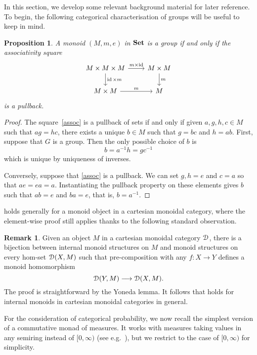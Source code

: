 \documentclass[a4paper,UKenglish,numberwithinsect,cleveref, autoref, thm-restate]{lipics-v2021}
\theoremstyle{plain} %
\newtheorem{myproposition}[mytheorem]{Proposition}
\theoremstyle{definition} %
\newtheorem{myremark}[mytheorem]{Remark}
\begin{document}
In this section, we develop some relevant background material for later reference.
To begin, the following categorical characterisation of groups will be useful to keep in mind.
\begin{myproposition}\label{assoc_group}
 A monoid $(M,m,e)$ in $\mathbf{Set}$ is a group if and only if the associativity square
 \begin{equation}\label{assoc}
  \begin{tikzcd}
   M \times M \times M \ar{d}{\id\times m} \ar{r}{m\times\id} & M\times M \ar{d}{m} \\
   M\times M \ar{r}{m} & M
  \end{tikzcd}
 \end{equation}
 is a pullback.
\end{myproposition}
\begin{proof}
 The square~\eqref{assoc} is a pullback of sets if and only if given $a,g,h,c\in M$ such that $ag=hc$, there exists a unique $b\in M$ such that $g=bc$ and $h=ab$.
 First, suppose that $G$ is a group. Then the only possible choice of $b$ is 
 \[
  b = a^{-1}h = gc^{-1}
 \]
 which is unique by uniqueness of inverses. 
 
 Conversely, suppose that \eqref{assoc} is a pullback. We can set $g,h=e$ and $c=a$ so that $ae=ea=a$. 
 Instantiating the pullback property on these elements gives $b$ such that $ab=e$ and $ba=e$, that is, $b=a^{-1}$.
\end{proof}

 holds generally for a monoid object in a cartesian monoidal category, where the element-wise proof still applies thanks to the following standard observation.

\begin{myremark}
\label{yonedaremark}
	Given an object $M$ in a cartesian monoidal category $\mathcal{D}$, there is a bijection between internal monoid structures on $M$ and monoid structures on every hom-set $\mathcal{D}(X, M)$ such that pre-composition with any $f : X \to Y$ defines a monoid homomorphism
	\[
		\mathcal{D}(Y, M) \longrightarrow \mathcal{D}(X, M).
	\]
	The proof is straightforward by the Yoneda lemma.
	It follows that  holds for internal monoids in cartesian monoidal categories in general.
\end{myremark}

For the consideration of categorical probability, we now recall the simplest version of a commutative monad of measures.
It works with measures taking values in any semiring instead of $[0,\infty)$ (see e.g.~\cite[Section~5.1]{coumans2013scalars}), 
but we restrict to the case of $[0,\infty)$ for simplicity.
\end{document}
